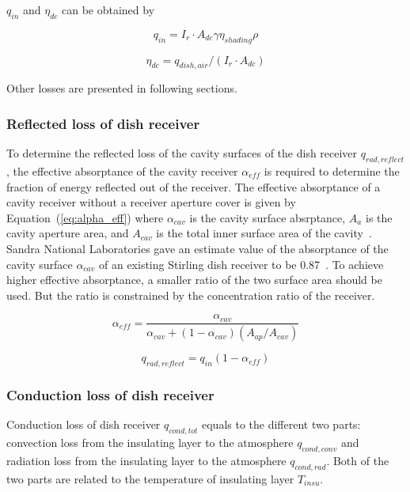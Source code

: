 \documentclass{article}
\begin{document}
$q_{in}$ and $\eta_{dc}$ can be obtained by

\begin{equation}
	q_{in}=I_r\cdot A_{dc}\gamma\eta_{shading}\rho
	\label{eq:q_in}
\end{equation}

\begin{equation}
	\eta_{dc}=q_{dish,air}/\left(I_r\cdot A_{dc}\right)
	\label{eq:eta_dc}
\end{equation}

Other losses are presented in following sections.

\subsubsection{Reflected loss of dish receiver}
To determine the reflected loss of the cavity surfaces of the dish receiver $q_{rad,reflect}$, the effective absorptance of the cavity receiver $\alpha_{eff}$ is required to determine the fraction of energy reflected out of the receiver. The effective absorptance of a cavity receiver without a receiver aperture cover is given by Equation~(\ref{eq:alpha_eff}) where $\alpha_{cav}$ is the cavity surface absrptance, $A_a$ is the cavity aperture area, and $A_{cav}$ is the total inner surface area of the cavity~\cite{Duffie2013}. Sandra National Laboratories gave an estimate value of the absorptance of the cavity surface $\alpha_{cav}$ of an existing Stirling dish receiver to be 0.87~\cite{Hogan1994}. To achieve higher effective absorptance, a smaller ratio of the two surface area should be used. But the ratio is constrained by the concentration ratio of the receiver.

\begin{equation}
	\alpha_{eff}=\dfrac{\alpha_{cav}}{\alpha_{cav}+\left(1-\alpha_{cav}\right)\left(A_{ap}/A_{cav}\right)}
	\label{eq:alpha_eff}
\end{equation}

\begin{equation*}
	q_{rad,reflect}=q_{in}(1-\alpha_{eff})
\end{equation*}

\subsubsection{Conduction loss of dish receiver}
Conduction loss of dish receiver $q_{cond,tot}$ equals to the different two parts: convection loss from the insulating layer to the atmosphere $q_{cond,conv}$ and radiation loss from the insulating layer to the atmosphere $q_{cond,rad}$. Both of the two parts are related to the temperature of insulating layer $T_{insu}$.
\end{document}

